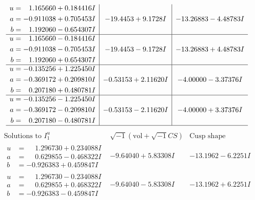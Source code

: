 \documentclass[1p]{elsarticle_modified}
\theoremstyle{definition}
\newcommand{\I}{\sqrt{-1}}
\begin{document}
$$\begin{array}{c|c|c}
\begin{aligned}
u &= \phantom{-}1.165660 + 0.184416 I \\
a &= -0.911038 + 0.705453 I \\
b &= \phantom{-}1.192060 - 0.654307 I\end{aligned}
 & -19.4453 + 9.1728 I & -13.26883 - 4.48783 I \\ \hline\begin{aligned}
u &= \phantom{-}1.165660 - 0.184416 I \\
a &= -0.911038 - 0.705453 I \\
b &= \phantom{-}1.192060 + 0.654307 I\end{aligned}
 & -19.4453 - 9.1728 I & -13.26883 + 4.48783 I \\ \hline\begin{aligned}
u &= -0.135256 + 1.225450 I \\
a &= -0.369172 + 0.209810 I \\
b &= \phantom{-}0.207180 + 0.480781 I\end{aligned}
 & -0.53153 + 2.11620 I & -4.00000 - 3.37376 I \\ \hline\begin{aligned}
u &= -0.135256 - 1.225450 I \\
a &= -0.369172 - 0.209810 I \\
b &= \phantom{-}0.207180 - 0.480781 I\end{aligned}
 & -0.53153 - 2.11620 I & -4.00000 + 3.37376 I\\
 \hline 
 \end{array}$$\newpage$$\begin{array}{c|c|c}  
\text{Solutions to }I^u_{1}& \I (\text{vol} + \sqrt{-1}CS) & \text{Cusp shape}\\
 \hline 
\begin{aligned}
u &= \phantom{-}1.296730 + 0.234088 I \\
a &= \phantom{-}0.629855 - 0.468322 I \\
b &= -0.926383 + 0.459847 I\end{aligned}
 & -9.64040 + 5.83308 I & -13.1962 - 6.2251 I \\ \hline\begin{aligned}
u &= \phantom{-}1.296730 - 0.234088 I \\
a &= \phantom{-}0.629855 + 0.468322 I \\
b &= -0.926383 - 0.459847 I\end{aligned}
 & -9.64040 - 5.83308 I & -13.1962 + 6.2251 I \\ \hline\begin{aligned}

\end{aligned}
\end{array}$$
\end{document}
